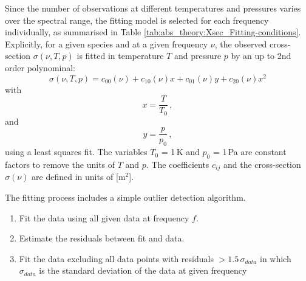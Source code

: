 Since the number of observations at different
temperatures and pressures varies over the spectral range, the fitting
model is selected for each frequency individually, as summarised in
Table \ref{tab:abs_theory:Xsec_Fitting-conditions}.
Explicitly, for a given species and at a given
frequency $\nu$, the observed cross-section
$\sigma(\nu,T,p)$ is fitted in temperature $T$ and pressure $p$
by an up to 2nd order polynominal:
\begin{equation}
  \label{eq:abs_theory:XsecFitmodel}
  \sigma(\nu,T,p)=c_{00}(\nu)+c_{10}(\nu)x+c_{01}(\nu)y+c_{20}(\nu)x^{2}
\end{equation}
 with 
 \begin{equation}
   \label{eq:abs_theory:Xsec_X_definition}
   x=\frac{T}{T_{0}}\,,
\end{equation}
and
\begin{equation}
  \label{eq:abs_theory:Xsec_Y_definition}
  y=\frac{p}{p_{0}}\,,
\end{equation}
using a least squares fit. The variables $T_{0}$ = 1\,K and $p_{0}$ = 1\,Pa
are constant factors to remove the units of $T$ and $p$. The coefficients
$c_{ij}$  and the cross-section $\sigma\left(\nu \right)$ are defined in units of [m$^2$]. 

The fitting process includes a simple outlier detection algorithm.
\begin{enumerate}
\item Fit the data using all given data at frequency $f$. 
\item Estimate the residuals between fit and data. 
\item Fit the data excluding all data points with residuals $>1.5\,\sigma_{data}$ in which
$\sigma_{data}$ is the standard deviation of the data at given frequency
\end{enumerate} 



